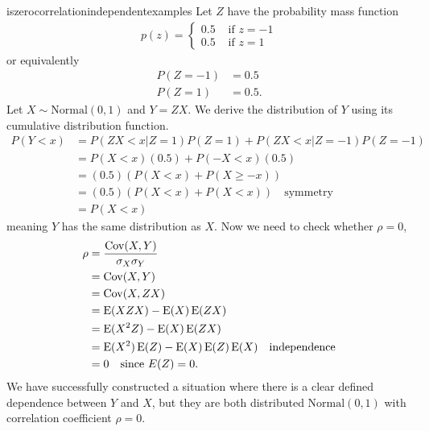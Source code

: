 \begin{answer}{iszerocorrelationindependentexamples}
Let $Z$ have the probability mass function
\begin{align*}
p(z) =
\begin{cases}
  0.5 & \text{ if } z = -1 \\
  0.5 & \text{ if } z = 1
\end{cases}
\end{align*}
or equivalently
\begin{align*}
P(Z = -1) &= 0.5  \\
P(Z =  1) &= 0.5
\text{.}
\end{align*}
Let $X \sim \text{Normal}(0,1)$
and
$Y = ZX$.
We derive the distribution of $Y$ using its cumulative distribution function.
\begin{align*}
P(Y<x) &=
P( ZX<x| Z = 1)P(Z=1) +
P( ZX<x| Z = -1)P(Z=-1) \\
&=
P( X<x)(0.5) + P(-X<x)(0.5) \\
&=  (0.5)( P( X<x) + P(X \geq -x)) \\
&=  (0.5)( P( X<x) + P(X < x)) \quad \text{symmetry} \\
&=   P(X < x)
\end{align*}
meaning $Y$ has the same distribution as $X$.
Now we need to check whether $\rho=0$,
\begin{align*}
\rho
&= \frac{\operatorname{\mathrm{Cov}}(X,Y)}{\sigma_X \sigma_Y}  \\
&= \operatorname{\mathrm{Cov}}(X,Y) \\
&= \operatorname{\mathrm{Cov}}(X, ZX) \\
&= \operatorname{\mathrm{E}}(XZX) - \operatorname{\mathrm{E}}(X) \operatorname{\mathrm{E}}(ZX)  \\
&= \operatorname{\mathrm{E}}(X^2 Z) - \operatorname{\mathrm{E}}(X) \operatorname{\mathrm{E}}(ZX)  \\
&= \operatorname{\mathrm{E}}(X^2) \operatorname{\mathrm{E}}(Z) - \operatorname{\mathrm{E}}(X)\operatorname{\mathrm{E}}(Z)\operatorname{\mathrm{E}}(X)   \quad \text{independence} \\
&=  0                                \quad \text{since } E(Z)=0
\text{.}
\end{align*}
We have successfully constructed a situation where
there is a clear defined dependence between $Y$ and $X$, but
they are both distributed $\text{Normal}(0,1)$ with correlation coefficient
$\rho = 0$.
\end{answer}
